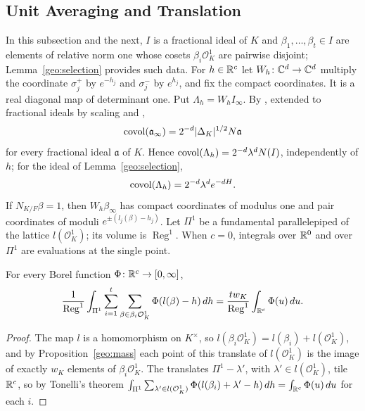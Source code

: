 \subsection{Unit Averaging and Translation}
In this subsection and the next, $I$ is a fractional ideal of $K$ and
$\beta_1,\dots,\beta_t\in I$ are elements of relative norm one whose
cosets $\beta_i\mathcal O_K^1$ are pairwise disjoint;
Lemma~\ref{geo:selection} provides such data. For $h\in\mathbb R^c$ let
$W_h\colon\mathbb C^d\to\mathbb C^d$ multiply the coordinate $\sigma_j^+$ by
$e^{-h_j}$ and $\sigma_j^-$ by $e^{h_j}$, and fix the compact
coordinates. It is a real diagonal map of determinant one. Put
$\Lambda_h=W_hI_\infty$. By \cite[Proposition~4.26]{MilneANT}, extended
to fractional ideals by scaling and \cite[Proposition~4.2]{MilneANT},
\[
 \operatorname{covol}(\mathfrak a_\infty)=2^{-d}|\Delta_K|^{1/2}N\mathfrak a
\]
for every fractional ideal $\mathfrak a$ of $K$. Hence
$\operatorname{covol}(\Lambda_h)=2^{-d}\lambda^dN(I)$, independently of $h$; for the
ideal of Lemma~\ref{geo:selection},
\begin{equation}\label{geo:determinant}
 \operatorname{covol}(\Lambda_h)=2^{-d}\lambda^de^{-dH}.
\end{equation}
If $N_{K/F}\beta=1$, then $W_h\beta_\infty$ has compact coordinates of
modulus one and pair coordinates of moduli $e^{\pm(l_j(\beta)-h_j)}$.
Let $\Pi^1$ be a fundamental parallelepiped of the lattice
$l(\mathcal O_K^1)$; its volume is $\operatorname{Reg}^1$. When $c=0$,
integrals over $\mathbb R^0$ and over $\Pi^1$ are evaluations at the single
point.

\begin{lemma}\label{geo:unfold-lemma}
For every Borel function $\Phi\colon\mathbb R^c\to[0,\infty]$,
\begin{equation}\label{geo:unfold}
 \frac1{\operatorname{Reg}^1}\int_{\Pi^1}\sum_{i=1}^t
 \sum_{\beta\in\beta_i\mathcal O_K^1}\Phi(l(\beta)-h)\,dh
 =\frac{tw_K}{\operatorname{Reg}^1}\int_{\mathbb R^c}\Phi(u)\,du .
\end{equation}
\end{lemma}

\begin{proof}
The map $l$ is a homomorphism on $K^\times$, so
$l(\beta_i\mathcal O_K^1)=l(\beta_i)+l(\mathcal O_K^1)$, and by
Proposition~\ref{geo:mass} each point of this translate of
$l(\mathcal O_K^1)$ is the image of exactly $w_K$ elements of
$\beta_i\mathcal O_K^1$. The translates $\Pi^1-\lambda'$, with
$\lambda'\in l(\mathcal O_K^1)$, tile $\mathbb R^c$, so by Tonelli's theorem
$\int_{\Pi^1}\sum_{\lambda'\in l(\mathcal
O_K^1)}\Phi(l(\beta_i)+\lambda'-h)\,dh=\int_{\mathbb R^c}\Phi(u)\,du$ for each
$i$.
\end{proof}

